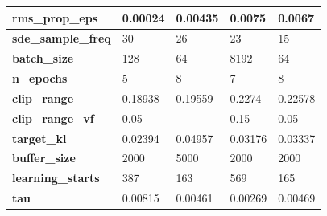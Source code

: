 \documentclass[../xlapes02]{subfiles}
\begin{document}
\begin{table}[!ht]
\begin{tabular}{|l||l|l||l|l|}
            \textbf{rms\_prop\_eps}            & 0.00024                                      & 0.00435                                      & 0.0075                                       & 0.0067                                       \\ \hline
            \textbf{sde\_sample\_freq}         & 30                                           & 26                                           & 23                                           & 15                                           \\ \hline
            \textbf{batch\_size}               & 128                                          & 64                                           & 8192                                         & 64                                           \\ \hline
            \textbf{n\_epochs}                 & 5                                            & 8                                            & 7                                            & 8                                            \\ \hline
            \textbf{clip\_range}               & 0.18938                                      & 0.19559                                      & 0.2274                                       & 0.22578                                      \\ \hline
            \textbf{clip\_range\_vf}           & 0.05                                         & ~                                            & 0.15                                         & 0.05                                         \\ \hline
            \textbf{target\_kl}                & 0.02394                                      & 0.04957                                      & 0.03176                                      & 0.03337                                      \\ \hline
            \textbf{buffer\_size}              & 2000                                         & 5000                                         & 2000                                         & 2000                                         \\ \hline
            \textbf{learning\_starts}          & 387                                          & 163                                          & 569                                          & 165                                          \\ \hline
            \textbf{tau}                       & 0.00815                                      & 0.00461                                      & 0.00269                                      & 0.00469                                      \\ \hline

\end{tabular}
\end{table}
\end{document}
